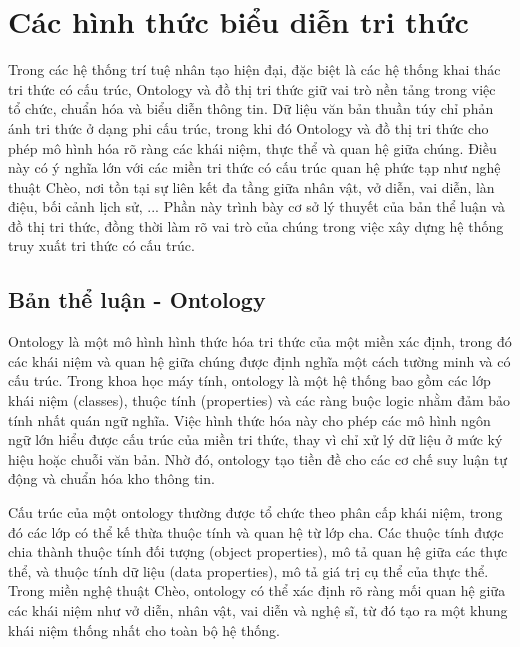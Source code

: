 
\section{Các hình thức biểu diễn tri thức}

Trong các hệ thống trí tuệ nhân tạo hiện đại, đặc biệt là các hệ thống khai thác tri thức có cấu trúc, Ontology và đồ thị tri thức giữ vai trò nền tảng trong việc tổ chức, chuẩn hóa và biểu diễn thông tin. Dữ liệu văn bản thuần túy chỉ phản ánh tri thức ở dạng phi cấu trúc, trong khi đó Ontology và đồ thị tri thức cho phép mô hình hóa rõ ràng các khái niệm, thực thể và quan hệ giữa chúng. Điều này có ý nghĩa lớn với các miền tri thức có cấu trúc quan hệ phức tạp như nghệ thuật Chèo, nơi tồn tại sự liên kết đa tầng giữa nhân vật, vở diễn, vai diễn, làn điệu, bối cảnh lịch sử, ... Phần này trình bày cơ sở lý thuyết của bản thể luận và đồ thị tri thức, đồng thời làm rõ vai trò của chúng trong việc xây dựng hệ thống truy xuất tri thức có cấu trúc.

\subsection{Bản thể luận - Ontology}

Ontology là một mô hình hình thức hóa tri thức của một miền xác định, trong đó các khái niệm và quan hệ giữa chúng được định nghĩa một cách tường minh và có cấu trúc. Trong khoa học máy tính, ontology là một hệ thống bao gồm các lớp khái niệm (classes), thuộc tính (properties) và các ràng buộc logic nhằm đảm bảo tính nhất quán ngữ nghĩa. Việc hình thức hóa này cho phép các mô hình ngôn ngữ lớn hiểu được cấu trúc của miền tri thức, thay vì chỉ xử lý dữ liệu ở mức ký hiệu hoặc chuỗi văn bản. Nhờ đó, ontology tạo tiền đề cho các cơ chế suy luận tự động và chuẩn hóa kho thông tin.

Cấu trúc của một ontology thường được tổ chức theo phân cấp khái niệm, trong đó các lớp có thể kế thừa thuộc tính và quan hệ từ lớp cha. Các thuộc tính được chia thành thuộc tính đối tượng (object properties), mô tả quan hệ giữa các thực thể, và thuộc tính dữ liệu (data properties), mô tả giá trị cụ thể của thực thể. Trong miền nghệ thuật Chèo, ontology có thể xác định rõ ràng mối quan hệ giữa các khái niệm như vở diễn, nhân vật, vai diễn và nghệ sĩ, từ đó tạo ra một khung khái niệm thống nhất cho toàn bộ hệ thống.

